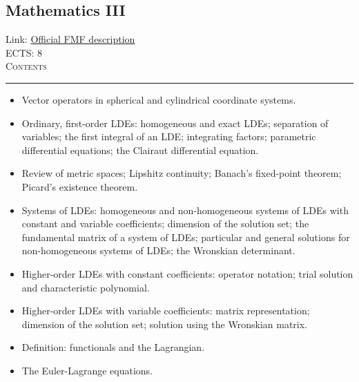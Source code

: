 \documentclass[11pt, a4paper]{article}
\newenvironment{course}[3]{
\subsection{#1}%
Link: \href{#2}{Official FMF description}\\%
ECTS: #3%
\vspace{1ex}
\\
{\large \textsc{Contents}}\\[-0.9ex]%
\rule{\textwidth}{0.5pt}
\vspace{-3ex}
}
{}
\newenvironment{chapter}[1]{
\begin{tcolorbox}[title=#1, breakable]
}
{\end{tcolorbox}}
\begin{document}
\begin{course}{Mathematics III}{https://www.fmf.uni-lj.si/en/study-physics/programmes/1fiz/2020/7000777/courses/522/}{8}
\begin{chapter}{Vector calculus}
\begin{itemize}
            \item Vector operators in spherical and cylindrical coordinate systems.
        
        \end{itemize}
        \end{chapter}

        \begin{chapter}{Ordinary differential equations}
            
            \begin{itemize}
            
                \item Ordinary, first-order LDEs: homogeneous and exact LDEs; separation of variables; the first integral of an LDE; integrating factors; parametric differential equations; the Clairaut differential equation.

                \item Review of metric spaces; Lipshitz continuity; Banach's fixed-point theorem; Picard's existence theorem.

                \item Systems of LDEs: homogeneous and non-homogeneous systems of LDEs with constant and variable coefficients; dimension of the solution set; the fundamental matrix of a system of LDEs; particular and general solutions for non-homogeneous systems of LDEs; the Wronskian determinant.

                \item Higher-order LDEs with constant coefficients: operator notation; trial solution and characteristic polynomial.

                \item Higher-order LDEs with variable coefficients: matrix representation; dimension of the solution set; solution using the Wronskian matrix.

            \end{itemize}

        \end{chapter}

        \begin{chapter}{Calculus of variations}
            \begin{itemize}
                
                \item Definition: functionals and the Lagrangian.

                \item The Euler-Lagrange equations.


\end{itemize}
\end{chapter}
\end{course}
\end{document}
